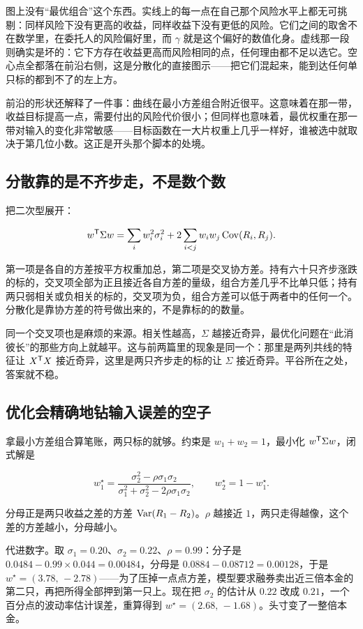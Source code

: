 图上没有``最优组合''这个东西。实线上的每一点在自己那个风险水平上都无可挑剔：同样风险下没有更高的收益，同样收益下没有更低的风险。它们之间的取舍不在数学里，在委托人的风险偏好里，而 \(\gamma\) 就是这个偏好的数值化身。虚线那一段则确实是坏的：它下方存在收益更高而风险相同的点，任何理由都不足以选它。空心点全都落在前沿右侧，这是分散化的直接图示——把它们混起来，能到达任何单只标的都到不了的左上方。

前沿的形状还解释了一件事：曲线在最小方差组合附近很平。这意味着在那一带，收益目标提高一点，需要付出的风险代价很小；但同样也意味着，最优权重在那一带对输入的变化非常敏感——目标函数在一大片权重上几乎一样好，谁被选中就取决于第几位小数。这正是开头那个脚本的处境。

\subsection{分散靠的是不齐步走，不是数个数}

把二次型展开：

\[
w^{\mathsf{T}}\Sigma w=\sum_i w_i^2\sigma_i^2+2\sum_{i<j}w_iw_j\operatorname{Cov}(R_i,R_j).
\]

第一项是各自的方差按平方权重加总，第二项是交叉协方差。持有六十只齐步涨跌的标的，交叉项全部为正且接近各自方差的量级，组合方差几乎不比单只低；持有两只弱相关或负相关的标的，交叉项为负，组合方差可以低于两者中的任何一个。分散化是靠协方差的符号做出来的，不是靠标的的数量。

同一个交叉项也是麻烦的来源。相关性越高，\(\Sigma\) 越接近奇异，最优化问题在``此消彼长''的那些方向上就越平。这与前两篇里的现象是同一个：那里是两列共线的特征让 \(X^{\mathsf{T}}X\) 接近奇异，这里是两只齐步走的标的让 \(\Sigma\) 接近奇异。平谷所在之处，答案就不稳。

\subsection{优化会精确地钻输入误差的空子}

拿最小方差组合算笔账，两只标的就够。约束是 \(w_1+w_2=1\)，最小化 \(w^{\mathsf{T}}\Sigma w\)，闭式解是

\[
w_1^\star=\frac{\sigma_2^2-\rho\sigma_1\sigma_2}{\sigma_1^2+\sigma_2^2-2\rho\sigma_1\sigma_2},\qquad w_2^\star=1-w_1^\star .
\]

分母正是两只收益之差的方差 \(\operatorname{Var}(R_1-R_2)\)。\(\rho\) 越接近 \(1\)，两只走得越像，这个差的方差越小，分母越小。

代进数字。取 \(\sigma_1=0.20\)、\(\sigma_2=0.22\)、\(\rho=0.99\)：分子是 \(0.0484-0.99\times0.044=0.00484\)，分母是 \(0.0884-0.08712=0.00128\)，于是 \(w^\star=(3.78,\,-2.78)\)——为了压掉一点点方差，模型要求融券卖出近三倍本金的第二只，再把所得全部押到第一只上。现在把 \(\sigma_2\) 的估计从 \(0.22\) 改成 \(0.21\)，一个百分点的波动率估计误差，重算得到 \(w^\star=(2.68,\,-1.68)\)。头寸变了一整倍本金。


